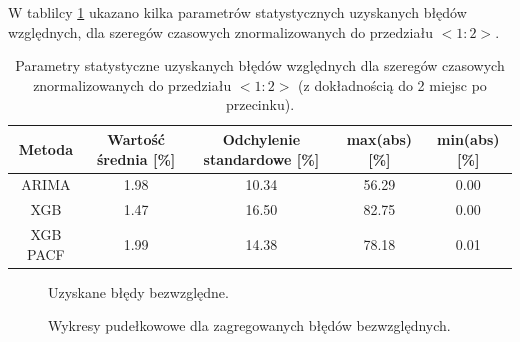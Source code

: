 \documentclass[11pt]{report}
\begin{document}
W tablilcy \ref{tab:abs_errors} ukazano kilka parametrów statystycznych uzyskanych błędów względnych, dla szeregów czasowych znormalizowanych do przedziału $<1:2>$.

\begin{table}[h]
    \centering
    \begin{tabular}{|c|c|c|c|c|}
        \hline
        \textbf{Metoda} & \textbf{Wartość średnia [\%]} & \textbf{Odchylenie standardowe [\%]} & \textbf{max(abs) [\%]} & \textbf{min(abs) [\%]} \\
        \hline
        ARIMA & 1.98 & 10.34 & 56.29 & 0.00 \\
        \hline
        XGB & 1.47 & 16.50 & 82.75 & 0.00 \\
        \hline
        XGB PACF & 1.99 & 14.38 & 78.18 & 0.01 \\
        \hline
    \end{tabular}
    \caption{Parametry statystyczne uzyskanych błędów względnych dla szeregów czasowych znormalizowanych do przedziału $<1:2>$ (z dokładnością do 2 miejsc po przecinku).}
    \label{tab:abs_errors}
\end{table}

\begin{figure}[H]
    \centering
    \begin{subfigure}[b]{0.3\textwidth}
        \centering
        \def\svgwidth{\columnwidth}
        
    \end{subfigure}
    \begin{subfigure}[b]{0.3\textwidth}
        \centering
        \def\svgwidth{\columnwidth}
        
    \end{subfigure}
    \begin{subfigure}[b]{0.3\textwidth}
        \centering
        \def\svgwidth{\columnwidth}
        
    \end{subfigure}
     \caption{Uzyskane błędy bezwzględne.}
\end{figure}

\begin{figure}[H]
    \centering
    \begin{subfigure}[b]{0.3\textwidth}
        \centering
        \def\svgwidth{\columnwidth}
        
    \end{subfigure}
    \begin{subfigure}[b]{0.3\textwidth}
        \centering
        \def\svgwidth{\columnwidth}
        
    \end{subfigure}
    \begin{subfigure}[b]{0.3\textwidth}
        \centering
        \def\svgwidth{\columnwidth}
        
    \end{subfigure}
     \caption{Wykresy pudełkowowe dla zagregowanych błędów bezwzględnych.}
\end{figure}
\end{document}
